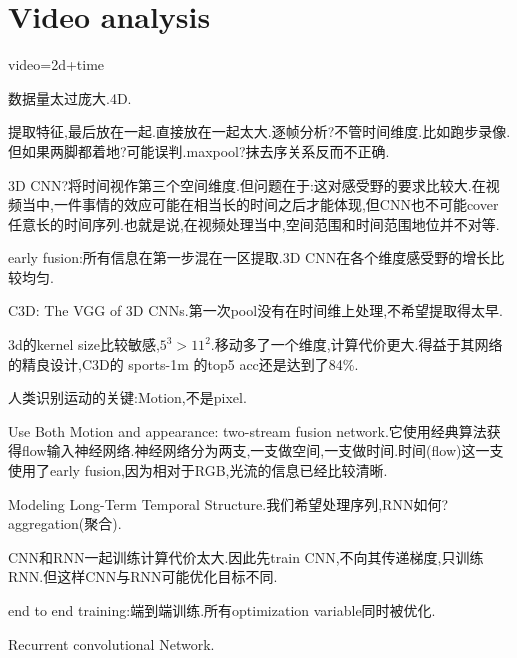 \section{Video analysis}
video=2d+time

数据量太过庞大.4D.

提取特征,最后放在一起.直接放在一起太大.逐帧分析?不管时间维度.比如跑步录像.但如果两脚都着地?可能误判.maxpool?抹去序关系反而不正确.

3D CNN?将时间视作第三个空间维度.但问题在于:这对感受野的要求比较大.在视频当中,一件事情的效应可能在相当长的时间之后才能体现,但CNN也不可能cover任意长的时间序列.也就是说,在视频处理当中,空间范围和时间范围地位并不对等.

early fusion:所有信息在第一步混在一区提取.3D CNN在各个维度感受野的增长比较均匀.

C3D: The VGG of 3D CNNs.第一次pool没有在时间维上处理,不希望提取得太早.

3d的kernel size比较敏感,$5^3 > 11^2$.移动多了一个维度,计算代价更大.得益于其网络的精良设计,C3D的 sports-1m 的top5 acc还是达到了84\%.

人类识别运动的关键:Motion,不是pixel.

Use Both Motion and appearance: two-stream fusion network.它使用经典算法获得flow输入神经网络.神经网络分为两支,一支做空间,一支做时间.时间(flow)这一支使用了early fusion,因为相对于RGB,光流的信息已经比较清晰.

Modeling Long-Term Temporal Structure.我们希望处理序列,RNN如何? aggregation(聚合).

CNN和RNN一起训练计算代价太大.因此先train CNN,不向其传递梯度,只训练RNN.但这样CNN与RNN可能优化目标不同.

end to end training:端到端训练.所有optimization variable同时被优化.

Recurrent convolutional Network.
